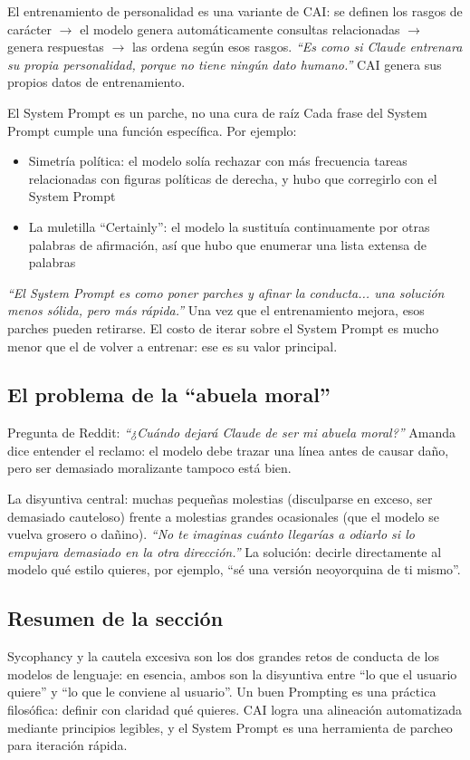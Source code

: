 El entrenamiento de personalidad es una variante de CAI: se definen los rasgos de carácter $\to$ el modelo genera automáticamente consultas relacionadas $\to$ genera respuestas $\to$ las ordena según esos rasgos. \textit{``Es como si Claude entrenara su propia personalidad, porque no tiene ningún dato humano.''} CAI genera sus propios datos de entrenamiento.

\begin{warningbox}{El System Prompt es un parche, no una cura de raíz}
Cada frase del System Prompt cumple una función específica. Por ejemplo:
\begin{itemize}
    \item Simetría política: el modelo solía rechazar con más frecuencia tareas relacionadas con figuras políticas de derecha, y hubo que corregirlo con el System Prompt
    \item La muletilla ``Certainly'': el modelo la sustituía continuamente por otras palabras de afirmación, así que hubo que enumerar una lista extensa de palabras
\end{itemize}

\textit{``El System Prompt es como poner parches y afinar la conducta... una solución menos sólida, pero más rápida.''} Una vez que el entrenamiento mejora, esos parches pueden retirarse. El costo de iterar sobre el System Prompt es mucho menor que el de volver a entrenar: ese es su valor principal.
\end{warningbox}

\subsection{El problema de la ``abuela moral''}

Pregunta de Reddit: \textit{``¿Cuándo dejará Claude de ser mi abuela moral?''} Amanda dice entender el reclamo: el modelo debe trazar una línea antes de causar daño, pero ser demasiado moralizante tampoco está bien.

La disyuntiva central: muchas pequeñas molestias (disculparse en exceso, ser demasiado cauteloso) frente a molestias grandes ocasionales (que el modelo se vuelva grosero o dañino). \textit{``No te imaginas cuánto llegarías a odiarlo si lo empujara demasiado en la otra dirección.''} La solución: decirle directamente al modelo qué estilo quieres, por ejemplo, ``sé una versión neoyorquina de ti mismo''.

\subsection{Resumen de la sección}

Sycophancy y la cautela excesiva son los dos grandes retos de conducta de los modelos de lenguaje: en esencia, ambos son la disyuntiva entre ``lo que el usuario quiere'' y ``lo que le conviene al usuario''. Un buen Prompting es una práctica filosófica: definir con claridad qué quieres. CAI logra una alineación automatizada mediante principios legibles, y el System Prompt es una herramienta de parcheo para iteración rápida.
